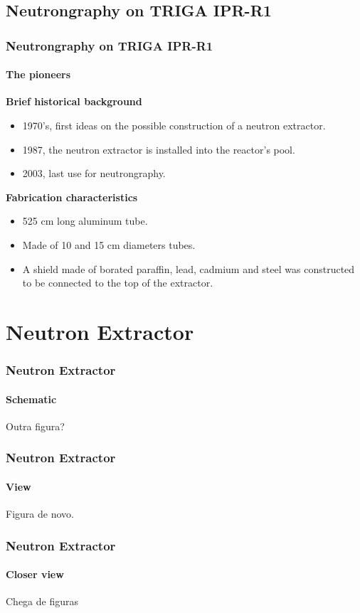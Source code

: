\documentclass[svgnames,smaller,table]{beamer}
\begin{document}
\subsection{Neutrongraphy on TRIGA IPR-R1}
\begin{frame}
  \frametitle{Neutrongraphy on TRIGA IPR-R1}
  \framesubtitle{The pioneers}
  \textbf{Brief historical background}
    \begin{itemize}
    \item 1970's, first ideas on the possible construction of a neutron extractor.
    \item 1987, the neutron extractor is installed into the reactor's pool.
    \item 2003, last use for neutrongraphy.
    \end{itemize}
    \vspace{10px}
  \textbf{Fabrication characteristics}
    \begin{itemize}
    \item 525 cm long aluminum tube.
    \item Made of 10 and 15 cm diameters tubes.
    \item A shield made of borated paraffin, lead, cadmium and steel was constructed to be connected to the top of the extractor.
    \end{itemize}
\end{frame}

\section{Neutron Extractor}
\begin{frame}
  \frametitle{Neutron Extractor}
  \framesubtitle{Schematic}
  \begin{center}
    Outra figura?
  \end{center}
\end{frame}

\begin{frame}
  \frametitle{Neutron Extractor}
  \framesubtitle{View}
  \begin{center}
    Figura de novo.
  \end{center}
\end{frame}

\begin{frame}
  \frametitle{Neutron Extractor}
  \framesubtitle{Closer view}
  \begin{center}
    Chega de figuras
  \end{center}
\end{frame}
\end{document}
